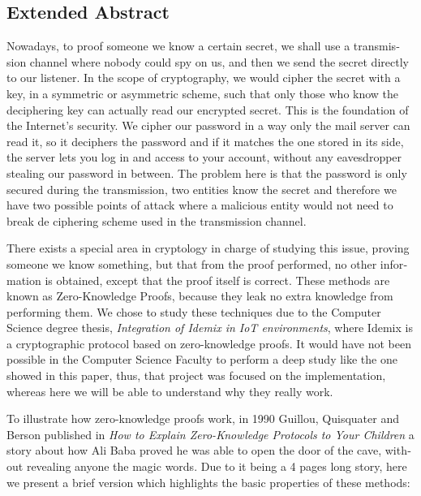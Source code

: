 
\begingroup
\let\clearpage\relax
\let\cleardoublepage\relax
\let\cleardoublepage\relax

\begin{otherlanguage}{english}
\chapter*{Extended Abstract}

Nowadays, to proof someone we know a certain secret, we shall use a transmission channel where nobody could spy on us, and then we send the secret directly to our listener. In the scope of cryptography, we would cipher the secret with a key, in a symmetric or asymmetric scheme, such that only those who know the deciphering key can actually read our encrypted secret. This is the foundation of the Internet's security. We cipher our password in a way only the mail server can read it, so it deciphers the password and if it matches the one stored in its side, the server lets you log in and access to your account, without any eavesdropper stealing our password in between. The problem here is that the password is only secured during the transmission, two entities know the secret and therefore we have two possible points of attack where a malicious entity would not need to break de ciphering scheme used in the transmission channel.

There exists a special area in cryptology in charge of studying this issue, proving someone we know something, but that from the proof performed, no other information is obtained, except that the proof itself is correct. These methods are known as Zero-Knowledge Proofs, because they leak no extra knowledge from performing them.
We chose to study these techniques due to the Computer Science degree thesis, \textit{Integration of Idemix in IoT environments}, where Idemix is a cryptographic protocol based on zero-knowledge proofs. It would have not been possible in the Computer Science Faculty to perform a deep study like the one showed in this paper, thus, that project was focused on the implementation, whereas here we will be able to understand why they really work.

To illustrate how zero-knowledge proofs work, in 1990 Guillou, Quisquater and Berson published in \textit{How to Explain Zero-Knowledge Protocols to Your Children} \citep{ZKPcave:story} a story about how Ali Baba proved he was able to open the door of the cave, without revealing anyone the magic words. Due to it being a 4 pages long story, here we present a brief version which highlights the basic properties of these methods:


\end{otherlanguage}
